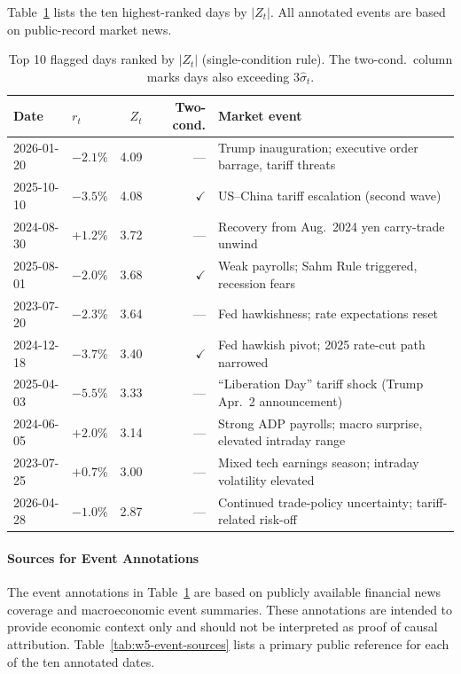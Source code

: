 \documentclass[12pt]{article}
\begin{document}
Table~\ref{tab:major-jumps} lists the ten highest-ranked days by $|Z_t|$. All annotated events are based on public-record market news.

\begin{table}[H]
\centering
\caption{Top 10 flagged days ranked by $|Z_t|$ (single-condition rule). The two-cond.\ column marks days also exceeding $3\hat{\sigma}_t$.}
\label{tab:major-jumps}
\small
\begin{tabular}{llrrl}
\toprule
Date & $r_t$ & $Z_t$ & Two-cond. & Market event \\
\midrule
2026-01-20 & $-2.1\%$ & 4.09 & ---         & Trump inauguration; executive order barrage, tariff threats \\
2025-10-10 & $-3.5\%$ & 4.08 & $\checkmark$ & US--China tariff escalation (second wave) \\
2024-08-30 & $+1.2\%$ & 3.72 & ---         & Recovery from Aug.\ 2024 yen carry-trade unwind \\
2025-08-01 & $-2.0\%$ & 3.68 & $\checkmark$ & Weak payrolls; Sahm Rule triggered, recession fears \\
2023-07-20 & $-2.3\%$ & 3.64 & ---         & Fed hawkishness; rate expectations reset \\
2024-12-18 & $-3.7\%$ & 3.40 & $\checkmark$ & Fed hawkish pivot; 2025 rate-cut path narrowed \\
2025-04-03 & $-5.5\%$ & 3.33 & ---         & ``Liberation Day'' tariff shock (Trump Apr.\ 2 announcement) \\
2024-06-05 & $+2.0\%$ & 3.14 & ---         & Strong ADP payrolls; macro surprise, elevated intraday range \\
2023-07-25 & $+0.7\%$ & 3.00 & ---         & Mixed tech earnings season; intraday volatility elevated \\
2026-04-28 & $-1.0\%$ & 2.87 & ---         & Continued trade-policy uncertainty; tariff-related risk-off \\
\bottomrule
\end{tabular}
\end{table}

\paragraph{Sources for Event Annotations}
\label{subsubsec:event-annotation-sources}

The event annotations in Table~\ref{tab:major-jumps} are based on publicly available financial news coverage and macroeconomic event summaries. These annotations are intended to provide economic context only and should not be interpreted as proof of causal attribution. Table~\ref{tab:w5-event-sources} lists a primary public reference for each of the ten annotated dates.
\end{document}
